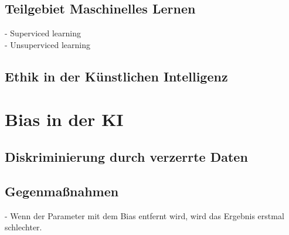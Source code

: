 \begin{onehalfspace}
        \subsection{Teilgebiet Maschinelles Lernen}
        \label{subsubsec:teilgebietML}
            -   Superviced learning \\
            -   Unsuperviced learning \\

        \subsection{Ethik in der Künstlichen Intelligenz}
        \label{subsubsec:ethikinderKI}

        \section{Bias in der \ac*{KI}}
        \label{subsec:KIundbias}

        \subsection{Diskriminierung durch verzerrte Daten}
        \label{subsubsec:diskriminierungdurchverzerrung}

        \subsection{Gegenma{\ss}nahmen}
        \label{subsubsec:gegenmassnahmen}
            -   Wenn der Parameter mit dem Bias entfernt wird, wird das Ergebnis erstmal schlechter. 
            \\

    \newpage
    \end{onehalfspace}